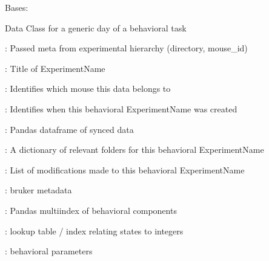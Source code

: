 \documentclass[letterpaper,10pt,english]{sphinxmanual}
\begin{document}
\begin{fulllineitems}
\label{\detokenize{Organization:Organization.BehavioralExperiment}}
\pysigstartsignatures
{}
\pysigstopsignatures
\sphinxAtStartPar
Bases: {\hyperref[\detokenize{Organization:Organization.Experiment}]{}}

\sphinxAtStartPar
Data Class for a generic day of a behavioral task
\begin{description}
\begin{DUlineblock}{0em}
\item[]  : Passed meta from experimental hierarchy (directory, mouse\_id)
\item[]  : Title of ExperimentName
\end{DUlineblock}

\begin{DUlineblock}{0em}
\item[]  : Identifies which mouse this data belongs to
\item[]  : Identifies when this behavioral ExperimentName was created
\end{DUlineblock}

\begin{DUlineblock}{0em}
\item[]  : Pandas dataframe of synced data
\item[]  : A dictionary of relevant folders for this behavioral ExperimentName
\item[]  : List of modifications made to this behavioral ExperimentName
\item[]  : bruker metadata
\item[] : Pandas multi\sphinxhyphen{}index of behavioral components
\item[]  : look\sphinxhyphen{}up table / index relating states to integers
\item[]  : behavioral parameters
\end{DUlineblock}


\end{description}
\end{fulllineitems}
\end{document}
